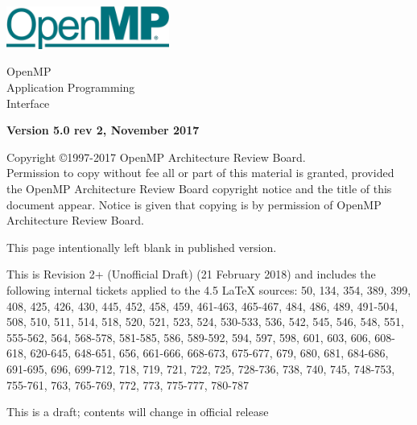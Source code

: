 
  \begin{titlepage}
    \begin{flushleft}
     \hspace{-6em} \includegraphics[width=0.4\textwidth]{openmp-logo.png}
    \end{flushleft}

    \begin{adjustwidth}{-0.75in}{0in}
    \begin{center}
      \Huge
      \textsf{OpenMP\\Application Programming\\Interface}

      \vspace{0.5in}\textsf{    }\vspace{-0.7in}
      \normalsize

      \vspace{1.0in}

      \textbf{Version 5.0 rev 2, November 2017}
    \end{center}
    \end{adjustwidth}

    \vspace{3.0in}

\begin{adjustwidth}{0pt}{1em}\setlength{\parskip}{0.25\baselineskip}%
Copyright \copyright 1997-2017 OpenMP Architecture Review Board.\\
Permission to copy without fee all or part of this material is granted,
provided the OpenMP Architecture Review Board copyright notice and
the title of this document appear. Notice is given that copying is by
permission of OpenMP Architecture Review Board.\end{adjustwidth}

  \end{titlepage}


\clearpage
\thispagestyle{empty}
\phantom{a}
This page intentionally left blank in published version.

This is Revision 2+ (Unofficial Draft) (21 February 2018) and
includes the following internal tickets applied to the 4.5 LaTeX sources:
50, 134, 354, 389, 399, 408, 425, 426, 430, 445, 452, 458, 459, 461-463, 
465-467, 484, 486, 489, 491-504, 508, 510, 511, 514, 518, 520, 521, 523, 
524, 530-533, 536, 542, 545, 546, 548, 551, 555-562, 564, 568-578, 581-585, 
586, 589-592, 594, 597, 598, 601, 603, 606, 608-618, 620-645, 
648-651, 656, 661-666, 668-673, 675-677, 679, 680, 681, 684-686, 691-695, 
696, 699-712, 718, 719, 721, 722, 725, 728-736, 738, 740, 745, 748-753, 
755-761, 763, 765-769, 772, 773, 775-777, 780-787

This is a draft; contents will change in official release

\vfill

